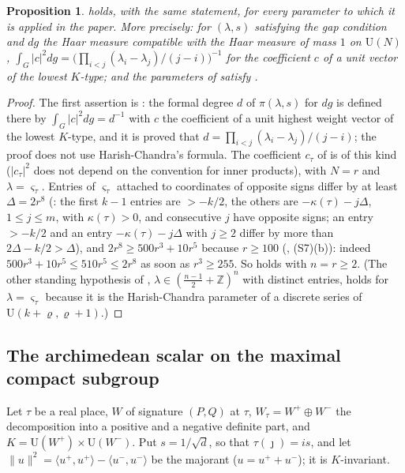 \documentclass[10pt]{amsart}
\newtheorem{proposition}[theorem]{Proposition}
\theoremstyle{definition}
\theoremstyle{remark}
\newcommand{\Z}{\mathbb Z}
\providecommand{\auU}{\mathrm U}
\begin{document}
\begin{proposition}\label{pwf:haar}
{\cite[Proposition~5.2]{P51}} holds, with the same statement, for every parameter to which it is
applied in the paper. More precisely: for $(\lambda,s)$ satisfying the gap condition
{\cite[(49)]{P51}} and $dg$ the Haar measure compatible with the Haar measure of mass $1$ on
$\auU(N)$, $\int_G|c|^2dg=\bigl(\prod_{i<j}(\lambda_i-\lambda_j)/(j-i)\bigr)^{-1}$ for the coefficient
$c$ of a unit vector of the lowest $K$-type; and the parameters of {\cite[\S5]{P51}} satisfy
{\cite[(49)]{P51}}.
\end{proposition}
\begin{proof}
The first assertion is {\cite[Corollary~4.43]{P51}}: the formal degree $d$ of $\pi(\lambda,s)$ for
$dg$ is defined there by $\int_G|c|^2dg=d^{-1}$ with $c$ the coefficient of a unit highest weight
vector of the lowest $K$-type, and it is proved that $d=\prod_{i<j}(\lambda_i-\lambda_j)/(j-i)$; the
proof does not use Harish-Chandra's formula. The coefficient $c_\tau$ of {\cite[\S5]{P51}} is of this
kind ($|c_\tau|^2$ does not depend on the convention for inner products), with $N=r$ and $\lambda=
\varsigma_\tau$. Entries of $\varsigma_\tau$ attached to coordinates of opposite signs differ by at
least $\Delta=2r^8$ ({\cite[\S3.2.2]{P51}}: the first $k-1$ entries are $>-k/2$, the others are
$-\kappa(\tau)-j\Delta$, $1\le j\le m$, with $\kappa(\tau)>0$, and consecutive $j$ have opposite
signs; an entry $>-k/2$ and an entry $-\kappa(\tau)-j\Delta$ with $j\ge2$ differ by more than
$2\Delta-k/2>\Delta$), and $2r^8\ge500r^3+10r^5$ because $r\ge100$ ({\cite[Lemma~13.4]{P46}},
(S7)(b)): indeed $500r^3+10r^5\le510r^5\le2r^8$ as soon as $r^3\ge255$. So {\cite[(49)]{P51}} holds
with $n=r\ge2$. (The other standing hypothesis of {\cite[\S4.2]{P51}}, $\lambda\in(\frac{n-1}2+\Z)^n$ with
distinct entries, holds for $\lambda=\varsigma_\tau$ because it is the Harish-Chandra parameter of a
discrete series of $\auU(k+\varrho,\varrho+1)$.)
\end{proof}

\subsection{The archimedean scalar on the maximal compact subgroup}\label{pwf:ss-delta}

Let $\tau$ be a real place, $W$ of signature $(P,Q)$ at $\tau$, $W_\tau=W^+\oplus W^-$ the
decomposition into a positive and a negative definite part, and $K=\auU(W^+)\times\auU(W^-)$. Put
$s=1/\sqrt d$, so that $\tau(\jmath)=is$, and let $\|u\|^2=\langle u^+,u^+\rangle-\langle u^-,u^-\rangle$
be the majorant ($u=u^++u^-$); it is $K$-invariant.
\end{document}
